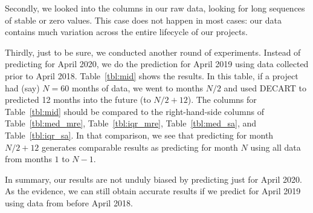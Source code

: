 \documentclass[sigconf,review,anonymous]{acmart}
\begin{document}
Secondly, we looked into the columns in our raw data, looking for long sequences of stable or zero values. This case does not happen in most cases: our data contains much variation across the entire lifecycle of our projects.

Thirdly, just to be sure, we conducted another round of experiments. Instead of predicting for April 2020, we do the prediction for April 2019 using
data collected prior to April 2018.
 Table~\ref{tbl:mid} shows the results. In this table, if a project had (say) $N=60$ months of data, we went to months $N/2$ and used DECART to predicted 12 months into the future (to $N/2+12$). The columns for Table~\ref{tbl:mid}  should be compared to the right-hand-side columns of Table~\ref{tbl:med_mre}, Table~\ref{tbl:iqr_mre},  Table~\ref{tbl:med_sa}, and Table~\ref{tbl:iqr_sa}. In that comparison, we see that predicting for month $N/2+12$ generates comparable results as predicting for  month $N$ using all data from months  $1$ to $N-1$. 
 
 In summary,
our results are not unduly biased by predicting just for April 2020. As the evidence, we can still obtain accurate results if we predict for April 2019 using data from before April 2018.
\end{document}
